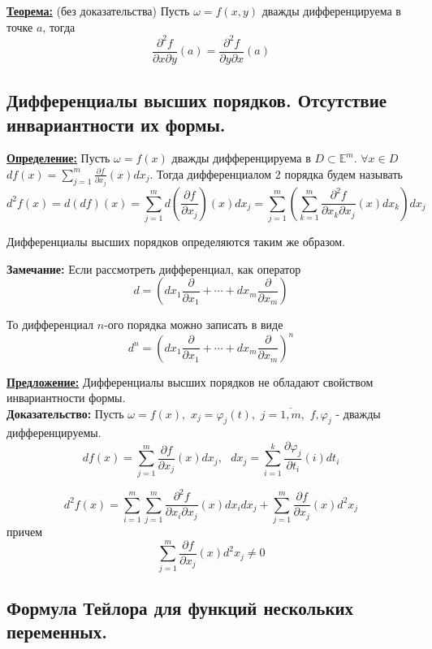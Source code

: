 \documentclass[a4paper,12pt]{article} %
\begin{document}
\underline{\textbf{Теорема:}} (без доказательства) Пусть $\omega = f(x, y)$ дважды дифференцируема в точке $a$, тогда
\[
	\frac{\partial^2f}{\partial{x}\partial{y}}(a) = \frac{\partial^2f}{\partial{y}\partial{x}}(a)
\]

\subsection{Дифференциалы высших порядков. Отсутствие инвариантности их формы.}

\underline{\textbf{Определение:}} Пусть $\omega = f(x)$ дважды дифференцируема в $D \subset \mathbb{E}^m$. $\forall x\in D $ $df(x) = \sum\limits_{j=1}^m\frac{\partial f}{\partial x_j}(x)dx_j$. Тогда дифференциалом 2 порядка будем называть
\[
	d^2f(x) =d(df)(x) = \sum\limits_{j=1}^md\left(\frac{\partial f}{\partial x_j}\right)(x)dx_j= \sum\limits_{j=1}^m\left(\sum\limits_{k=1}^m
	\frac{\partial^2f}{\partial x_k\partial x_j}(x)dx_k\right)dx_j
\]

Дифференциалы высших порядков определяются таким же образом.
\vspace{5mm}

\textbf{Замечание:} Если рассмотреть дифференциал, как оператор
\[
	d = \left(dx_1\frac{\partial}{\partial x_1}+\cdots+dx_m\frac{\partial}{\partial x_m}\right)
\]

То дифференциал $n$-ого порядка можно записать в виде
\[
	d^n = \left(dx_1\frac{\partial}{\partial x_1}+\cdots+dx_m\frac{\partial}{\partial x_m}\right)^n
\]

\underline{\textbf{Предложение:}} Дифференциалы высших порядков не обладают свойством инвариантности формы.\\

\textbf{Доказательство:} Пусть $\omega = f(x), $ $x_j=\varphi_j(t), $  $j=\overline{1, m}, $ $f, \varphi_j$ - дважды дифференцируемы.
\[
	df(x) = \sum\limits_{j=1}^m\frac{\partial f}{\partial x_j}(x)dx_j, \text{ }dx_j = \sum\limits_{i=1}^k\frac{\partial \varphi_j}{\partial t_i}(i)dt_i
\]

\[
	d^2f(x) = \sum\limits_{i=1}^m\sum\limits_{j=1}^m
	\frac{\partial^2f}{\partial x_i\partial x_j}(x)dx_idx_j+\sum\limits_{j=1}^m\frac{\partial f}{\partial x_j}(x)d^2x_j
\]
причем
\[
	\sum\limits_{j=1}^m\frac{\partial f}{\partial x_j}(x)d^2x_j \neq 0
\]

\subsection{Формула Тейлора для функций нескольких переменных.}
\end{document}
